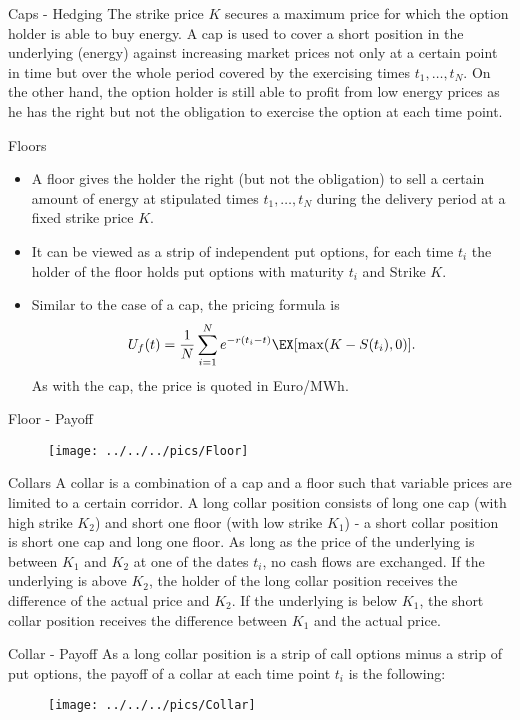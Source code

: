 {Caps - Hedging}
The strike price $K$ secures a maximum price for which the option holder is able to buy energy. A cap is used to cover a short position in the underlying (energy) against
increasing market prices not only at a certain point in time but over the whole period covered by the exercising times $t_1,\ldots,t_N$.
On the other hand, the option holder is still able to profit from low energy prices as he has the right but not the obligation to exercise the option at each time point.

{Floors}
\begin{itemize}
\item<1-> A floor gives the holder the right (but not the
obligation) to sell a certain amount of energy at stipulated times
$t_1,\ldots,t_N$ during the delivery period at a fixed strike
price $K$.
\item<2-> It can be viewed as a strip of
independent put options, for each time $t_i$ the holder of the floor holds put options with maturity $t_i$ and Strike $K$.
\item<3->
Similar to the case of a cap, the pricing formula is
$$U_f(t)=\frac{1}{N}\sum_{i=1}^Ne^{-r(t_i-t)}\EX[\max(K-S(t_i),0)].$$
As with the cap, the price is quoted in Euro/MWh.
\end{itemize}

{Floor - Payoff}
\begin{figure}
	\centering
		\texttt{[image: ../../../pics/Floor]}
	\label{fig:Floor}
\end{figure}

{Collars}
A collar is a combination of a cap and a floor such that variable prices are limited to a certain corridor. A long collar position consists of long one cap (with high strike $K_2$) and short one floor (with low strike $K_1$) - a short collar position is short one cap and long one floor. As long as the price of the underlying is between $K_1$ and $K_2$ at one of the dates $t_i$, no cash flows are exchanged. If the underlying is above $K_2$, the holder of the long collar position receives the difference of the actual price and $K_2$. If the underlying is below $K_1$, the short collar position receives the difference between $K_1$ and the actual price.

{Collar - Payoff}
As a long collar position is a strip of call options minus a strip of put options, the payoff of a collar at each time point $t_i$ is the following:
\begin{figure}
	\centering
		\texttt{[image: ../../../pics/Collar]}
	\label{fig:Collar}
\end{figure}

